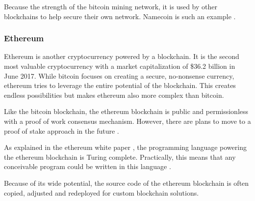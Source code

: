 Because the strength of the bitcoin mining network, it is used by other blockchains to help secure their own network. Namecoin is such an example \cite{namecoin-whitepaper}.

\subsubsection{Ethereum}

Ethereum is another cryptocurrency powered by a blockchain. It is the second most valuable cryptocurrency with a market capitalization of \$36.2 billion in June 2017. While bitcoin focuses on creating a secure, no-nonsense currency, ethereum tries to leverage the entire potential of the blockchain. This creates endless possibilities but makes ethereum also more complex than bitcoin.

Like the bitcoin blockchain, the ethereum blockchain is public and permissionless with a proof of work consensus mechanism. However, there are plans to move to a proof of stake approach in the future \cite{ethereum-pos-faq}. 

As explained in the ethereum white paper \cite{ethereum-whitepaper}, the programming language powering the ethereum blockchain is Turing complete. Practically, this means that any conceivable program could be written in this language \cite{definition-turing-completeness}.

Because of its wide potential, the source code of the ethereum blockchain is often copied, adjusted and redeployed for custom blockchain solutions. 

